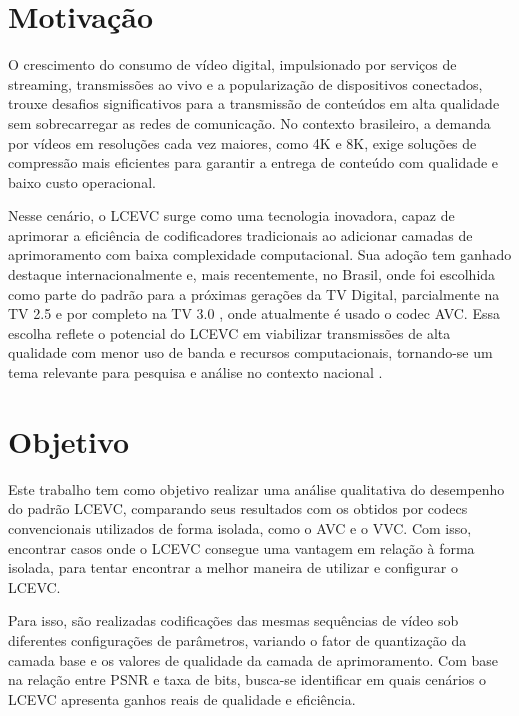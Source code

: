 \section{Motivação}

O crescimento do consumo de vídeo digital, impulsionado por serviços de streaming, transmissões ao vivo e a 
popularização de dispositivos conectados, trouxe desafios significativos para a transmissão de conteúdos em 
alta qualidade sem sobrecarregar as redes de comunicação. No contexto brasileiro, a demanda por vídeos em 
resoluções cada vez maiores, como 4K e 8K, exige soluções de compressão mais eficientes para garantir a 
entrega de conteúdo com qualidade e baixo custo operacional.

Nesse cenário, o \acrfull{LCEVC} surge como uma tecnologia inovadora, 
capaz de aprimorar a eficiência de codificadores tradicionais ao adicionar camadas de aprimoramento com baixa 
complexidade computacional. Sua adoção tem ganhado destaque internacionalmente e, mais recentemente, no Brasil, 
onde foi escolhida como parte do padrão para a próximas gerações da TV Digital, parcialmente na TV 2.5 e por 
completo na TV 3.0 \cite{tv_25, tv_30}, onde atualmente é usado o codec \acrfull{AVC}. Essa escolha reflete o 
potencial do \acrshort{LCEVC} em viabilizar transmissões de alta qualidade com menor uso de banda e recursos 
computacionais, tornando-se um tema relevante para pesquisa e análise no contexto nacional \cite{lcevc_tvdigital, globo_lcevc}.

\section{Objetivo}

Este trabalho tem como objetivo realizar uma análise qualitativa do desempenho do padrão \acrfull{LCEVC}, comparando 
seus resultados com os obtidos por codecs convencionais utilizados de forma isolada, como o \acrshort{AVC} e o 
\acrshort{VVC}. Com isso, encontrar casos onde o \acrshort{LCEVC} consegue uma vantagem em relação à forma isolada,
para tentar encontrar a melhor maneira de utilizar e configurar o \acrshort{LCEVC}.

Para isso, são realizadas codificações das mesmas sequências de vídeo sob diferentes configurações
de parâmetros, variando o fator de quantização da camada base e os valores de qualidade da camada de aprimoramento. 
Com base na relação entre \acrshort{PSNR} e taxa de bits, busca-se identificar em quais cenários o \acrshort{LCEVC}
apresenta ganhos reais de qualidade e eficiência.

